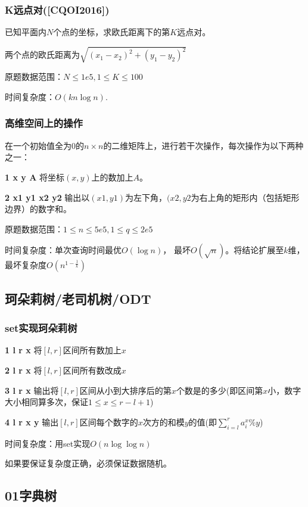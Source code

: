 \documentclass[landscape,twocolumn,twoside,a4paper]{article}
\begin{document}
\subsubsection{K远点对([CQOI2016])}
已知平面内$N$个点的坐标，求欧氏距离下的第$K$远点对。\par
两个点的欧氏距离为$\sqrt{(x_1-x_2)^{2}+(y_1-y_2)^{2}}$\par
原题数据范围：$N\leq 1e5, 1\leq K\leq 100$\par
时间复杂度：$O(kn\log{n}).$


\subsubsection{高维空间上的操作}
在一个初始值全为$0$的$n\times n$的二维矩阵上，进行若干次操作，每次操作为以下两种之一：\par
\textbf{1 x y A} 将坐标$(x,y)$上的数加上$A$。\par
\textbf{2 x1 y1 x2 y2} 输出以$(x1, y1)$为左下角，$(x2, y2$为右上角的矩形内（包括矩形边界）的数字和。\par
原题数据范围：$1\leq n \leq 5e5, 1\leq q \leq 2e5$\par
时间复杂度：单次查询时间最优$O(\log{n})$， 最坏$O(\sqrt{n})$。将结论扩展至$k$维，最坏复杂度$O(n^{1-\frac{1}{k}})$



\subsection{珂朵莉树/老司机树/ODT}
\subsubsection{set实现珂朵莉树}
\textbf{1 l r x} 将$[l,r]$区间所有数加上$x$\par
\textbf{2 l r x} 将$[l,r]$区间所有数改成$x$\par
\textbf{3 l r x} 输出将$[l,r]$区间从小到大排序后的第$x$个数是的多少(即区间第$x$小，数字大小相同算多次，保证$1\leq x \leq r-l+1$)\par
\textbf{4 l r x y} 输出$[l,r]$区间每个数字的$x$次方的和模$y$的值(即$\sum ^ {r}_{i=l} a_i^x \% y$)\par
时间复杂度：用set实现$O(n\log \log {n})$\par
如果要保证复杂度正确，必须保证数据随机。\par



\subsection{01字典树}
\end{document}
